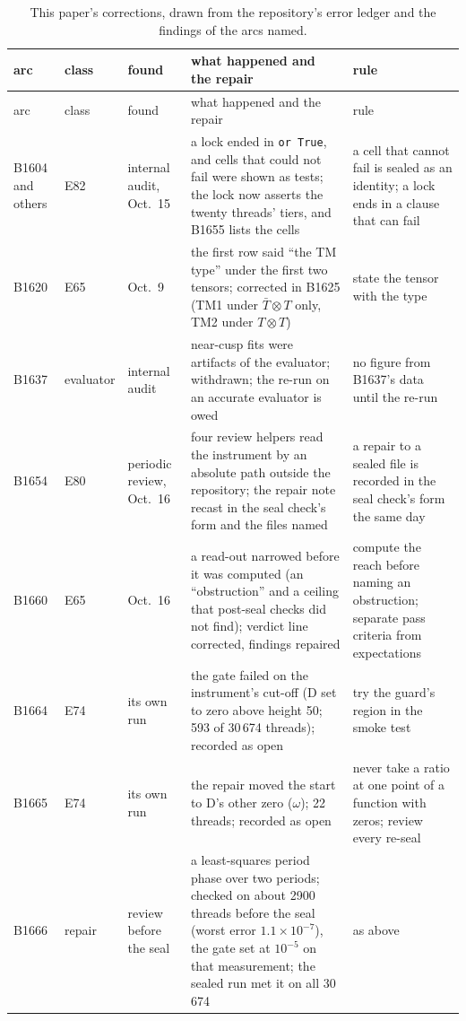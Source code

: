 {\footnotesize
\begin{longtable}{@{}p{1.8cm}p{1.65cm}p{2.0cm}p{5.05cm}p{3.6cm}@{}}
\caption{This paper's corrections, drawn from the repository's error ledger and the findings of the arcs named.}\label{tab:corrections}\\
\toprule
arc & class & found & what happened and the repair & rule \\
\midrule
\endfirsthead
\toprule
arc & class & found & what happened and the repair & rule \\
\midrule
\endhead
\bottomrule
\endlastfoot
B1604 and others & E82 & internal audit, Oct.\ 15 & a lock ended in \texttt{or True}, and cells that could not fail were shown as tests; the lock now asserts the twenty threads' tiers, and B1655 lists the cells & a cell that cannot fail is sealed as an identity; a lock ends in a clause that can fail \\
B1620 & E65 & Oct.\ 9 & the first row said ``the TM type'' under the first two tensors; corrected in B1625 (TM1 under $\bar T\otimes T$ only, TM2 under $T\otimes T$) & state the tensor with the type \\
B1637 & evaluator & internal audit & near-cusp fits were artifacts of the evaluator; withdrawn; the re-run on an accurate evaluator is owed & no figure from B1637's data until the re-run \\
B1654 & E80 & periodic review, Oct.\ 16 & four review helpers read the instrument by an absolute path outside the repository; the repair note recast in the seal check's form and the files named & a repair to a sealed file is recorded in the seal check's form the same day \\
B1660 & E65 & Oct.\ 16 & a read-out narrowed before it was computed (an ``obstruction'' and a ceiling that post-seal checks did not find); verdict line corrected, findings repaired & compute the reach before naming an obstruction; separate pass criteria from expectations \\
B1664 & E74 & its own run & the gate failed on the instrument's cut-off (D set to zero above height 50; 593 of 30\,674 threads); recorded as open & try the guard's region in the smoke test \\
B1665 & E74 & its own run & the repair moved the start to D's other zero ($\omega$); 22 threads; recorded as open & never take a ratio at one point of a function with zeros; review every re-seal \\
B1666 & repair & review before the seal & a least-squares period phase over two periods; checked on about 2900 threads before the seal (worst error $1.1\times10^{-7}$), the gate set at $10^{-5}$ on that measurement; the sealed run met it on all 30\,674 & as above \\

\end{longtable}}
